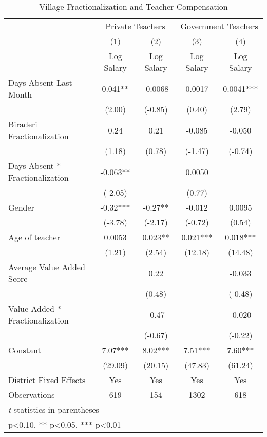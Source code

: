 \begin{table}[htbp]\centering
\def\sym#1{\ifmmode^{#1}\else\(^{#1}\)\fi}
\caption{Village Fractionalization and Teacher Compensation\label{teachercompensation}}
\begin{tabular}{l*{4}{c}}
\toprule
                &\multicolumn{2}{c}{Private Teachers}&\multicolumn{2}{c}{Government Teachers}\\\cmidrule(lr){2-3}\cmidrule(lr){4-5}
                &\multicolumn{1}{c}{(1)}&\multicolumn{1}{c}{(2)}&\multicolumn{1}{c}{(3)}&\multicolumn{1}{c}{(4)}\\
                &\multicolumn{1}{c}{Log Salary}&\multicolumn{1}{c}{Log Salary}&\multicolumn{1}{c}{Log Salary}&\multicolumn{1}{c}{Log Salary}\\
\midrule
Days Absent Last Month&    0.041** &  -0.0068   &   0.0017   &   0.0041***\\
                &   (2.00)   &  (-0.85)   &   (0.40)   &   (2.79)   \\
Biraderi Fractionalization&     0.24   &     0.21   &   -0.085   &   -0.050   \\
                &   (1.18)   &   (0.78)   &  (-1.47)   &  (-0.74)   \\
Days Absent * Fractionalization&   -0.063** &            &   0.0050   &            \\
                &  (-2.05)   &            &   (0.77)   &            \\
Gender          &    -0.32***&    -0.27** &   -0.012   &   0.0095   \\
                &  (-3.78)   &  (-2.17)   &  (-0.72)   &   (0.54)   \\
Age of teacher  &   0.0053   &    0.023** &    0.021***&    0.018***\\
                &   (1.21)   &   (2.54)   &  (12.18)   &  (14.48)   \\
Average Value Added Score&            &     0.22   &            &   -0.033   \\
                &            &   (0.48)   &            &  (-0.48)   \\
Value-Added * Fractionalization&            &    -0.47   &            &   -0.020   \\
                &            &  (-0.67)   &            &  (-0.22)   \\
Constant        &     7.07***&     8.02***&     7.51***&     7.60***\\
                &  (29.09)   &  (20.15)   &  (47.83)   &  (61.24)   \\
District Fixed Effects&      Yes   &      Yes   &      Yes   &      Yes   \\
\midrule
Observations    &      619   &      154   &     1302   &      618   \\
\bottomrule
\multicolumn{5}{l}{\footnotesize \textit{t} statistics in parentheses}\\
\multicolumn{5}{l}{\footnotesize * p<0.10, ** p<0.05, *** p<0.01}\\
\end{tabular}
\end{table}
